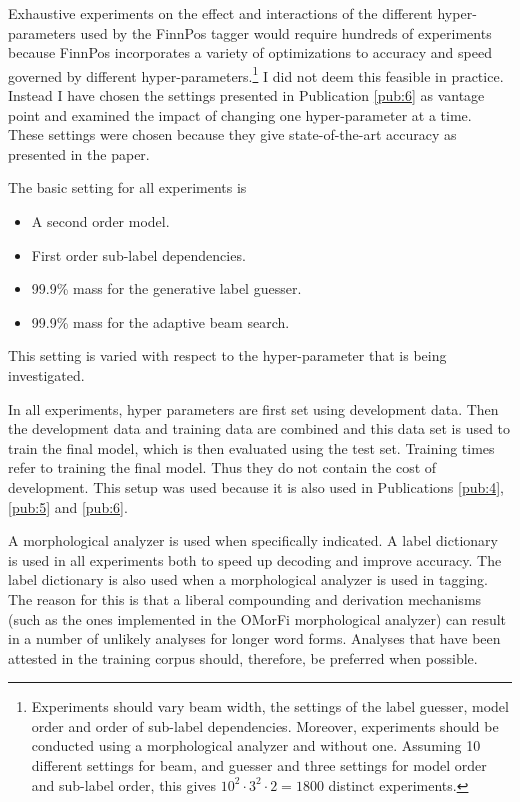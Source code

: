 Exhaustive experiments on the effect and interactions of the different
hyper-parameters used by the FinnPos tagger would require hundreds of
experiments because FinnPos incorporates a variety of optimizations to
accuracy and speed governed by different
hyper-parameters.\footnote{Experiments should vary beam width, the
  settings of the label guesser, model order and order of sub-label
  dependencies. Moreover, experiments should be conducted using a
  morphological analyzer and without one. Assuming 10 different
  settings for beam, and guesser and three settings for model order
  and sub-label order, this gives $10^2\cdot 3^2 \cdot 2 = 1800$
  distinct experiments.} I did not deem this feasible in
practice. Instead I have chosen the settings presented in Publication
\ref{pub:6} as vantage point and examined the impact of changing one
hyper-parameter at a time. These settings were chosen because they
give state-of-the-art accuracy as presented in the paper.

The basic setting for all experiments is 
\begin{itemize}
\item A second order model.
\item First order sub-label dependencies.
\item 99.9\% mass for the generative label guesser.
\item 99.9\% mass for the adaptive beam search.
\end{itemize}
This setting is varied with respect to the hyper-parameter that is being investigated.

In all experiments, hyper parameters are first set using development
data. Then the development data and training data are combined and
this data set is used to train the final model, which is then
evaluated using the test set. Training times refer to training the
final model. Thus they do not contain the cost of development. This
setup was used because it is also used in Publications \ref{pub:4},
\ref{pub:5} and \ref{pub:6}.

A morphological analyzer is used when specifically indicated. A label
dictionary is used in all experiments both to speed up decoding and
improve accuracy. The label dictionary is also used when a
morphological analyzer is used in tagging. The reason for this is that
a liberal compounding and derivation mechanisms (such as the ones
implemented in the OMorFi morphological analyzer) can result in a
number of unlikely analyses for longer word forms. Analyses that have
been attested in the training corpus should, therefore, be preferred
when possible.

